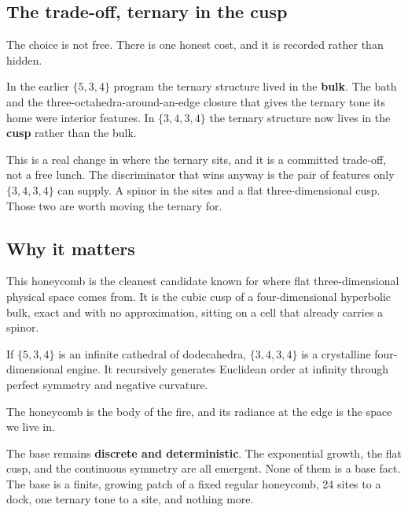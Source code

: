 \subsection{The trade-off, ternary in the cusp}

The choice is not free. There is one honest cost, and it is recorded rather than hidden.

In the earlier $\{5,3,4\}$ program the ternary structure lived in the \textbf{bulk}. The bath and the three-octahedra-around-an-edge closure that gives the ternary tone its home were interior features. In $\{3,4,3,4\}$ the ternary structure now lives in the \textbf{cusp} rather than the bulk.

This is a real change in where the ternary sits, and it is a committed trade-off, not a free lunch. The discriminator that wins anyway is the pair of features only $\{3,4,3,4\}$ can supply. A spinor in the sites and a flat three-dimensional cusp. Those two are worth moving the ternary for.

\subsection{Why it matters}

This honeycomb is the cleanest candidate known for where flat three-dimensional physical space comes from. It is the cubic cusp of a four-dimensional hyperbolic bulk, exact and with no approximation, sitting on a cell that already carries a spinor.

If $\{5,3,4\}$ is an infinite cathedral of dodecahedra, $\{3,4,3,4\}$ is a crystalline four-dimensional engine. It recursively generates Euclidean order at infinity through perfect symmetry and negative curvature.

\begin{principle}
The honeycomb is the body of the fire, and its radiance at the edge is the space we live in.
\end{principle}

The base remains \textbf{discrete and deterministic}. The exponential growth, the flat cusp, and the continuous symmetry are all emergent. None of them is a base fact. The base is a finite, growing patch of a fixed regular honeycomb, 24 sites to a dock, one ternary tone to a site, and nothing more.
